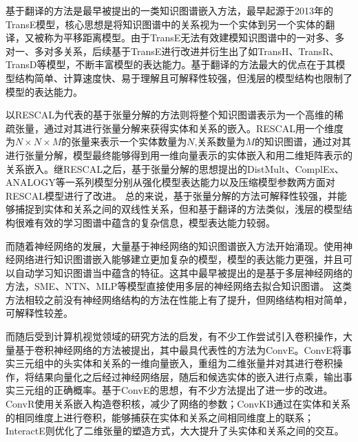 基于翻译的方法是最早被提出的一类知识图谱嵌入方法，最早起源于2013年的TransE模型，核心思想是将知识图谱中的关系视为一个实体到另一个实体的翻译，又被称为平移距离模型。由于TransE无法有效建模知识图谱中的一对多、多对一、多对多关系，后续基于TransE进行改进并衍生出了如TransH、TransR、TransD等模型，不断丰富模型的表达能力。基于翻译的方法最大的优点在于其模型结构简单、计算速度快、易于理解且可解释性较强，但浅层的模型结构也限制了模型的表达能力。

以RESCAL为代表的基于张量分解的方法则将整个知识图谱表示为一个高维的稀疏张量，通过对其进行张量分解来获得实体和关系的嵌入。RESCAL用一个维度为$N\times N\times M$的张量来表示一个实体数量为$N$,关系数量为$M$的知识图谱，通过对其进行张量分解，模型最终能够得到用一维向量表示的实体嵌入和用二维矩阵表示的关系嵌入。继RESCAL之后，基于张量分解的思想提出的DistMult、ComplEx、ANALOGY等一系列模型分别从强化模型表达能力以及压缩模型参数两方面对RESCAL模型进行了改进。
总的来说，基于张量分解的方法可解释性较强，并能够捕捉到实体和关系之间的双线性关系，但和基于翻译的方法类似，浅层的模型结构很难有效的学习图谱中蕴含的复杂信息，模型表达能力较弱。

而随着神经网络的发展，大量基于神经网络的知识图谱嵌入方法开始涌现。使用神经网络进行知识图谱嵌入能够建立更加复杂的模型，模型的表达能力更强，并且可以自动学习知识图谱当中蕴含的特征。这其中最早被提出的是基于多层神经网络的方法，SME、NTN、MLP等模型直接使用多层的神经网络去拟合知识图谱。
这类方法相较之前没有神经网络结构的方法在性能上有了提升，但网络结构相对简单，可解释性较差。



而随后受到计算机视觉领域的研究方法的启发，有不少工作尝试引入卷积操作，大量基于卷积神经网络的方法被提出，其中最具代表性的方法为ConvE。ConvE将事实三元组中的头实体和关系的一维向量嵌入，重组为二维张量并对其进行卷积操作，将结果向量化之后经过神经网络层，随后和候选实体的嵌入进行点乘，输出事实三元组的正确概率。基于ConvE的思想，有不少方法提出了进一步的改进。ConvR使用关系嵌入构造卷积核，减少了网络的参数；ConvKB通过在实体和关系的相同维度上进行卷积，能够捕获在实体和关系之间相同维度上的联系；InteractE则优化了二维张量的塑造方式，大大提升了头实体和关系之间的交互。

